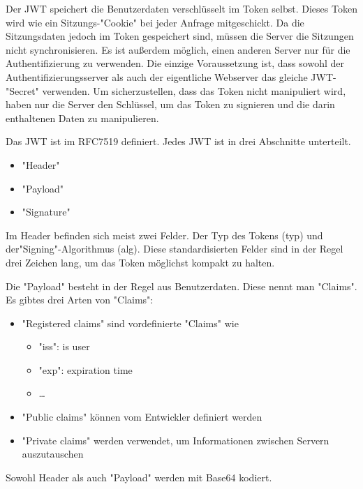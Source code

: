 \label{sec:jwt}

Der JWT speichert die Benutzerdaten verschlüsselt im Token selbst. Dieses Token wird wie ein Sitzungs-"Cookie" bei jeder Anfrage mitgeschickt. 
Da die Sitzungsdaten jedoch im Token gespeichert sind, müssen die Server die Sitzungen nicht synchronisieren. 
Es ist außerdem möglich, einen anderen Server nur für die Authentifizierung zu verwenden. 
Die einzige Voraussetzung ist, dass sowohl der Authentifizierungsserver als auch der eigentliche Webserver das gleiche JWT-"Secret" verwenden. 
Um sicherzustellen, dass das Token nicht manipuliert wird, haben nur die Server den Schlüssel, um das Token zu signieren und die darin enthaltenen Daten zu manipulieren. 

Das JWT ist im RFC7519 definiert. Jedes JWT ist in drei Abschnitte unterteilt. 

\begin{itemize}
    \item "Header"
    \item "Payload"
    \item "Signature"
\end{itemize}

Im Header befinden sich meist zwei Felder. 
Der Typ des Tokens (typ) und der\linebreak"Signing"-Algorithmus (alg). 
Diese standardisierten Felder sind in der Regel drei Zeichen lang, um das Token möglichst kompakt zu halten.

Die "Payload" besteht in der Regel aus Benutzerdaten. Diese nennt man "Claims". Es gibtes drei Arten von "Claims": 

\begin{itemize}
    \item "Registered claims" sind vordefinierte "Claims" wie
    \begin{itemize}
        \item "iss": is user
        \item "exp":  expiration time
        \item …
    \end{itemize}
    \item "Public claims" können vom Entwickler definiert werden
    \item "Private claims" werden verwendet, um Informationen zwischen Servern auszutauschen
\end{itemize}

Sowohl Header als auch "Payload" werden mit Base64 kodiert.

